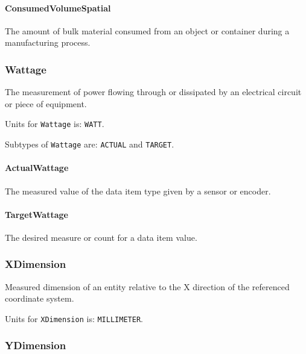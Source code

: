 \paragraph{ConsumedVolumeSpatial}\mbox{}
\label{sec:ConsumedVolumeSpatial}



The amount of bulk material consumed from an object or container during a manufacturing process.


\subsubsection{Wattage}
\label{sec:Wattage}



The measurement of power flowing through or dissipated by an electrical circuit or piece of equipment.


Units for \texttt{Wattage} is: \texttt{WATT}.


Subtypes of \texttt{Wattage} are: \texttt{ACTUAL} and \texttt{TARGET}. 
\FloatBarrier

\paragraph{ActualWattage}\mbox{}
\label{sec:ActualWattage}



The measured value of the data item type given by a sensor or encoder.


\paragraph{TargetWattage}\mbox{}
\label{sec:TargetWattage}



The desired measure or count for a data item value.


\subsubsection{XDimension}
\label{sec:XDimension}



Measured dimension of an entity relative to the X direction of the referenced coordinate system.


Units for \texttt{XDimension} is: \texttt{MILLIMETER}.

\FloatBarrier

\subsubsection{YDimension}
\label{sec:YDimension}



